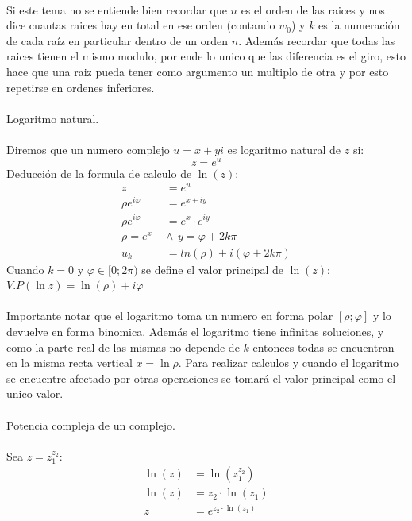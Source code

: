 \documentclass[]{article}
\begin{document}
\\
Si este tema no se entiende bien recordar que $n$ es el orden de las raices y nos dice cuantas raices hay en total en ese orden (contando $w_0$) y $k$ es la numeración de cada raíz en particular dentro de un orden $n$. Además recordar que todas las raices tienen el mismo modulo, por ende lo unico que las diferencia es el giro, esto hace que una raiz pueda tener como argumento un multiplo de otra y por esto repetirse en ordenes inferiores.
\\
\\
\Large Logaritmo natural.
\normalsize
\\
\\
Diremos que un numero complejo $u = x+yi$ es logaritmo natural de $z$ si:
$$
z = e^{u}
$$
Deducción de la formula de calculo de $\ln(z)$:
\begin{align}
  z &= e^{u}\\
  \rho e^{i\varphi} &= e^{x+iy}\\
  \rho e^{i\varphi} &= e^{x}\cdot e^{iy}\\
  \rho = e^{x} \hspace{5pt} & \wedge\hspace{5pt} y = \varphi +2k\pi\\
  u_k &= ln(\rho) + i (\varphi + 2k\pi)
\end{align}
Cuando $k=0$ y $\varphi \in [0;2\pi)$ se define el valor principal de $\ln(z)$: $V.P(\ln z)  = \ln (\rho) + i\varphi$
\\
\\
Importante notar que el logaritmo toma un numero en forma polar $[\rho;\varphi]$ y lo devuelve en forma binomica. Además el logaritmo tiene infinitas soluciones, y como la parte real de las mismas no depende de $k$ entonces todas se encuentran en la misma recta vertical $x=\ln\rho$. Para realizar calculos y cuando el logaritmo se encuentre afectado por otras operaciones se tomará el valor principal como el unico valor.
\\
\\
\Large Potencia compleja de un complejo.
\normalsize
\\
\\
Sea $z = z_1^{z_2}$:
\begin{align}
  \ln(z) &= \ln(z_1^{z_2}) \\
  \ln(z) &= z_2 \cdot \ln(z_1)\\
  z &= e^{z_2\cdot\ln(z_1)}\\
\end{align}
\\
\end{document}
